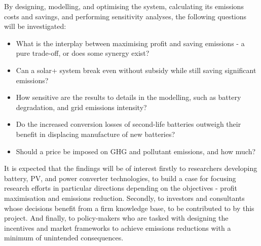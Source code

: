 \documentclass[report_18month.tex]{subfiles}
\begin{document}
By designing, modelling, and optimising the system, calculating its emissions costs and savings, and performing sensitivity analyses, the following questions will be investigated:
\begin{itemize}
\item What is the interplay between maximising profit and saving emissions - a pure trade-off, or does some synergy exist?
\item Can a solar+ system break even without subsidy while still saving significant emissions?
\item How sensitive are the results to details in the modelling, such as battery degradation, and grid emissions intensity?
\item Do the increased conversion losses of second-life batteries outweigh their benefit in displacing manufacture of new batteries?
\item Should a price be imposed on GHG and pollutant emissions, and how much?
\end{itemize}

It is expected that the findings will be of interest firstly to researchers developing battery, PV, and power converter technologies, to build a case for focusing research efforts in particular directions depending on the objectives - profit maximisation and emissions reduction. Secondly, to investors and consultants whose decisions benefit from a firm knowledge base, to be contributed to by this project. And finally, to policy-makers who are tasked with designing the incentives and market frameworks to achieve emissions reductions with a minimum of unintended consequences.
\end{document}
